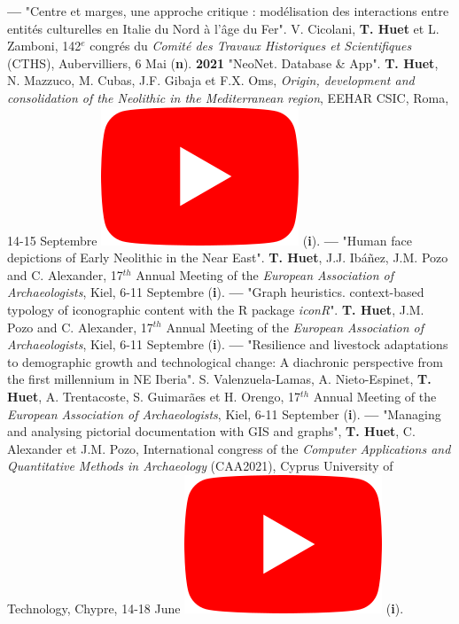 \documentclass{article}
\begin{document}
\textbf{--- }"Centre et marges, une approche critique : modélisation des interactions entre entités culturelles en Italie du Nord à l'âge du Fer". V. Cicolani, \textbf{T. Huet} et L. Zamboni, 142${}^{e}$ congr\'{e}s du \textit{Comit\'{e} des Travaux Historiques et Scientifiques} (CTHS), Aubervilliers, 6 Mai (\textbf{n}).
\smallbreak
\textbf{2021 }"NeoNet. Database \& App". \textbf{T. Huet}, N. Mazzuco, M. Cubas, J.F. Gibaja et F.X. Oms, \textit{Origin, development and consolidation of the Neolithic in the Mediterranean region}, EEHAR CSIC, Roma, 14-15 Septembre \href{https://youtu.be/GM2niot0XwE?t=10700}{\includegraphics[scale=0.2]{icon_youtube}} (\textbf{i}).
\smallbreak
\textbf{--- }"Human face depictions of Early Neolithic in the Near East". \textbf{T. Huet}, J.J. Ibáñez, J.M. Pozo and C. Alexander, 17${}^{th}$ Annual Meeting of the \textit{European Association of Archaeologists}, Kiel, 6-11 Septembre (\textbf{i}).
\smallbreak
\textbf{--- }"Graph heuristics. context-based typology of iconographic content with the R package \textit{iconR}". \textbf{T. Huet}, J.M. Pozo and C. Alexander, 17${}^{th}$ Annual Meeting of the \textit{European Association of Archaeologists}, Kiel, 6-11 Septembre (\textbf{i}).
\smallbreak
\textbf{--- }"Resilience and livestock adaptations to demographic growth and technological change: A diachronic perspective from the first millennium in NE Iberia". S. Valenzuela-Lamas, A. Nieto-Espinet, \textbf{T. Huet}, A. Trentacoste, S. Guimarães et H. Orengo, 17${}^{th}$ Annual Meeting of the \textit{European Association of Archaeologists}, Kiel, 6-11 September (\textbf{i}).
\smallbreak
\textbf{--- }"Managing and analysing pictorial documentation with GIS and graphs", \textbf{T. Huet}, C. Alexander et J.M. Pozo, International congress of the \textit{Computer Applications and Quantitative Methods in Archaeology} (CAA2021), Cyprus University of Technology, Chypre, 14-18 June \href{https://youtu.be/tUhHhzGSgbk?t=4950}{\includegraphics[scale=0.2]{icon_youtube}} (\textbf{i}).
\end{document}
